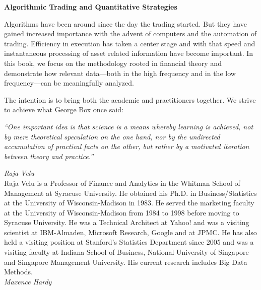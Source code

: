 
\begin{center} {\large\bfseries Algorithmic Trading and Quantitative Strategies} \end{center}

Algorithms have been around since the day the trading started. But they have gained increased importance with the advent of computers and the automation of trading. Efficiency in execution has taken a center stage and with that speed and instantaneous processing of asset related information have become important. In this book, we focus on the methodology rooted in financial theory and demonstrate how relevant data---both in the high frequency and in the low frequency---can be meaningfully analyzed. 


The intention is to bring both the academic and practitioners together. We strive to achieve what George Box once said: \par
\begin{center}
\begin{minipage}[t]{0.7\textwidth}
	\raggedright
  	{\itshape``One important idea is that science is a means whereby learning is achieved, not by mere theoretical speculation on the one hand, nor by the undirected accumulation of practical facts on the other, but rather by a motivated iteration between theory and practice.''}
\end{minipage} 
\end{center}


\newpage


{\noindent\large\itshape Raja Velu} \\[0.2cm]
\noindent Raja Velu is a Professor of Finance and Analytics in the Whitman School of Management at Syracuse University. He obtained his Ph.D. in Business/Statistics at the University of Wisconsin-Madison in 1983. He served the marketing faculty at the University of Wisconsin-Madison from 1984 to 1998 before moving to Syracuse University. He was a Technical Architect at Yahoo! and was a visiting scientist at IBM-Almaden, Microsoft Research, Google and at JPMC. He has also held a visiting position at Stanford's Statistics Department since 2005 and was a visiting faculty at Indiana School of Business, National University of Singapore and Singapore Management University. His current research includes Big Data Methods. \\


{\noindent\large\itshape Maxence Hardy} \\[0.2cm]


